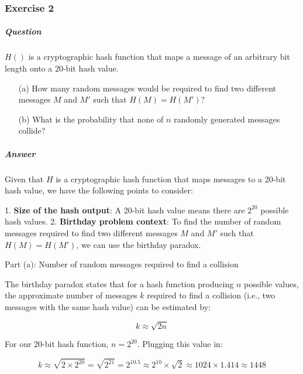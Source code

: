 \documentclass{article}
\begin{document}
                            \subsubsection{Exercise 2}
                            \subparagraph{Question}

                                \( H() \) is a cryptographic hash function that maps a message of an arbitrary bit length onto a 20-bit hash value.

                                \begin{enumerate}
                                    \item[(a)] How many random messages would be required to find two different messages \( M \) and \( M' \) such that \( H(M) = H(M') \)?
                                    \item[(b)] What is the probability that none of \( n \) randomly generated messages collide?
                                \end{enumerate}

                            \subparagraph{Answer}
                            Given that \( H \) is a cryptographic hash function that maps messages to a 20-bit hash value, we have the following points to consider:

                            1. \textbf{Size of the hash output}: A 20-bit hash value means there are \( 2^{20} \) possible hash values.
                            2. \textbf{Birthday problem context}: To find the number of random messages required to find two different messages \( M \) and \( M' \) such that \( H(M) = H(M') \), we can use the birthday paradox.
                            
                             Part (a): Number of random messages required to find a collision
                            
                            The birthday paradox states that for a hash function producing \( n \) possible values, the approximate number of messages \( k \) required to find a collision (i.e., two messages with the same hash value) can be estimated by:
                            
                            \[ k \approx \sqrt{2n} \]
                            
                            For our 20-bit hash function, \( n = 2^{20} \). Plugging this value in:
                            
                            \[ k \approx \sqrt{2 \times 2^{20}} = \sqrt{2^{21}} = 2^{10.5} \approx 2^{10} \times \sqrt{2} \approx 1024 \times 1.414 \approx 1448 \]
                            
\end{document}
